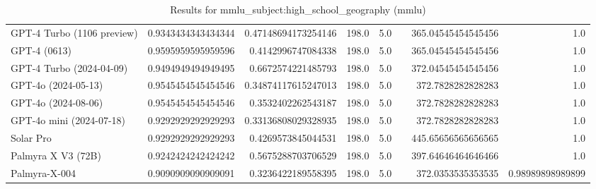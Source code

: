 \begin{table}[htp]
{\begin{tabular}{lrrrrrrr}
GPT-4 Turbo (1106 preview) & 0.9343434343434344 & 0.47148694173254146 & 198.0 & 5.0 &  & 365.04545454545456 & 1.0 \\
GPT-4 (0613) & 0.9595959595959596 & 0.4142996747084338 & 198.0 & 5.0 &  & 365.04545454545456 & 1.0 \\
GPT-4 Turbo (2024-04-09) & 0.9494949494949495 & 0.6672574221485793 & 198.0 & 5.0 &  & 372.04545454545456 & 1.0 \\
GPT-4o (2024-05-13) & 0.9545454545454546 & 0.34874117615247013 & 198.0 & 5.0 &  & 372.7828282828283 & 1.0 \\
GPT-4o (2024-08-06) & 0.9545454545454546 & 0.3532402262543187 & 198.0 & 5.0 &  & 372.7828282828283 & 1.0 \\
GPT-4o mini (2024-07-18) & 0.9292929292929293 & 0.33136808029328935 & 198.0 & 5.0 &  & 372.7828282828283 & 1.0 \\
Solar Pro & 0.9292929292929293 & 0.4269573845044531 & 198.0 & 5.0 &  & 445.65656565656565 & 1.0 \\
Palmyra X V3 (72B) & 0.9242424242424242 & 0.5675288703706529 & 198.0 & 5.0 &  & 397.64646464646466 & 1.0 \\
Palmyra-X-004 & 0.9090909090909091 & 0.3236422189558395 & 198.0 & 5.0 &  & 372.0353535353535 & 0.98989898989899 \\
\bottomrule
\end{tabular}}
\caption{Results for mmlu_subject:high_school_geography (mmlu)}
\label{fig:mmlu_subject:high_school_geography (mmlu)}
\end{table}